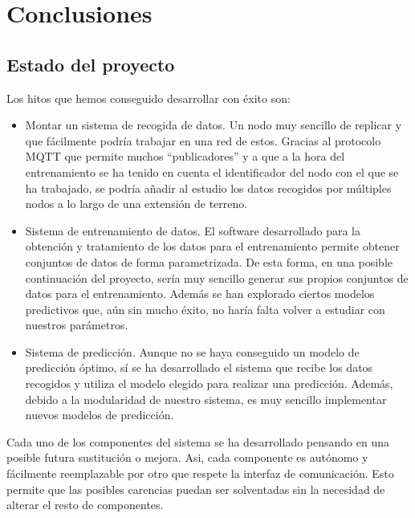 \cleardoublepage

\chapter{Conclusiones}
\label{makereference8}

\section{Estado del proyecto}

Los hitos que hemos conseguido desarrollar con éxito son:
\begin{itemize}
\item Montar un sistema de recogida de datos. Un nodo muy sencillo de replicar y que fácilmente podría trabajar en una red de estos. Gracias al protocolo MQTT que permite muchos ``publicadores'' y a que a la hora del entrenamiento se ha tenido en cuenta el identificador del nodo con el que se ha trabajado, se podría añadir al estudio los datos recogidos por múltiples nodos a lo largo de una extensión de terreno.

\item Sistema de entrenamiento de datos. El software desarrollado para la obtención y tratamiento de los datos para el entrenamiento permite obtener conjuntos de datos de forma parametrizada. De esta forma, en una posible continuación del proyecto, sería muy sencillo generar sus propios conjuntos de datos para el entrenamiento. Además se han explorado ciertos modelos predictivos que, aún sin mucho éxito, no haría falta volver a estudiar con nuestros parámetros.

\item Sistema de predicción. Aunque no se haya conseguido un modelo de predicción óptimo, sí se ha desarrollado el sistema que recibe los datos recogidos y utiliza el modelo elegido para realizar una predicción. Además, debido a la modularidad de nuestro sistema, es muy sencillo implementar nuevos modelos de predicción.
\end{itemize}

Cada uno de los componentes del sistema se ha desarrollado pensando en una posible futura sustitución o mejora. Asi, cada componente es autónomo y fácilmente reemplazable por otro que respete la interfaz de comunicación. Esto permite que las posibles carencias puedan ser solventadas sin la necesidad de alterar el resto de componentes.

